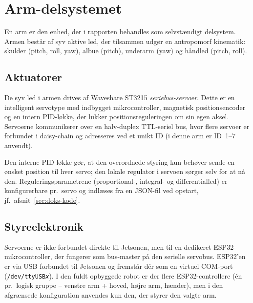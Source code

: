 \section{Arm-delsystemet}
\label{sec:arm-delsystem}

En arm er den enhed, der i rapporten behandles som selvstændigt delsystem.
Armen består af syv aktive led, der tilsammen udgør en antropomorf
kinematik: skulder (pitch, roll, yaw), albue (pitch), underarm (yaw) og
håndled (pitch, roll).

\subsection{Aktuatorer}

De syv led i armen drives af Waveshare ST3215 \emph{seriebus-servoer}.
Dette er en intelligent servotype med indbygget mikrocontroller, magnetisk
positionsencoder og en intern PID-løkke, der lukker positionsreguleringen
om sin egen aksel. Servoerne kommunikerer over en halv-duplex TTL-seriel
bus, hvor flere servoer er forbundet i daisy-chain og adresseres ved et
unikt ID (i denne arm er ID~1--7 anvendt).

Den interne PID-løkke gør, at den overordnede styring kun behøver sende en
ønsket position til hver servo; den lokale regulator i servoen sørger
selv for at nå den. Reguleringsparametrene (proportional-, integral- og
differentialled) er konfigurerbare pr.\ servo og indlæses fra en JSON-fil
ved opstart, jf.\ afsnit~\ref{sec:doks-kode}.


\subsection{Styreelektronik}

Servoerne er ikke forbundet direkte til Jetsonen, men til en dedikeret
ESP32-mikrocontroller, der fungerer som bus-master på den serielle
servobus. ESP32'en er via USB forbundet til Jetsonen og fremstår dér som
en virtuel COM-port (\texttt{/dev/ttyUSB\textit{x}}). I den fuldt opbyggede
robot er der flere ESP32-controllere (én pr.\ logisk gruppe -- venstre arm
+ hoved, højre arm, hænder), men i den afgrænsede konfiguration anvendes
kun den, der styrer den valgte arm.


